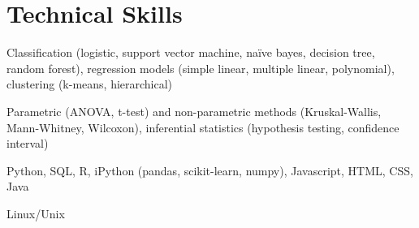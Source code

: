 
\section{Technical Skills}

 Classification (logistic, support vector machine, naïve bayes, decision tree, random forest), regression models (simple linear, multiple linear, polynomial), clustering (k-means, hierarchical)

 Parametric (ANOVA, t-test) and non-parametric methods (Kruskal-Wallis, Mann-Whitney, Wilcoxon), inferential statistics (hypothesis testing, confidence interval)

 Python, SQL, R, iPython (pandas, scikit-learn, numpy), Javascript, HTML, CSS, Java


 Linux/Unix
